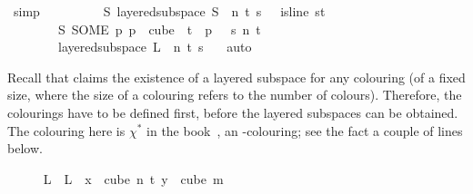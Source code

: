 \begin{isabellebody}
\ simp\isanewline
\ \ \ \ \ \ \isamarkupfalse%
\ \isamarkupfalse%
\ {\isachardoublequoteopen}{\isasymexists}S{\isachardot}{\kern0pt}\ layered{\isacharunderscore}{\kern0pt}subspace\ S\ {}\ n\ t\ s\ {\isasymchi}\ {\isasymand}\ is{\isacharunderscore}{\kern0pt}line\ {\isacharparenleft}{\kern0pt}{\isasymlambda}s{\isasymin}{\isacharbraceleft}{\kern0pt}{\isachardot}{\kern0pt}{\isachardot}{\kern0pt}{\isacharless}{\kern0pt}t\isanewline
\ \ \ \ \ \ {\isacharplus}{\kern0pt}\ {}{\isacharbraceright}{\kern0pt}{\isachardot}{\kern0pt}\ S\ {\isacharparenleft}{\kern0pt}SOME\ p{\isachardot}{\kern0pt}\ p\ {\isasymin}\ cube\ {}\ {\isacharparenleft}{\kern0pt}t{\isacharplus}{\kern0pt}{}{\isacharparenright}{\kern0pt}\ {\isasymand}\ p\ {}\ {\isacharequal}{\kern0pt}\ s{\isacharparenright}{\kern0pt}{\isacharparenright}{\kern0pt}\ n\ {\isacharparenleft}{\kern0pt}t\ {\isacharplus}{\kern0pt}\ {}{\isacharparenright}{\kern0pt}{\isachardoublequoteclose}\ \isamarkupfalse%
\isanewline
\ \ \ \ \ \ \ \ {\isacartoucheopen}layered{\isacharunderscore}{\kern0pt}subspace\ L\ {}\ n\ t\ s\ {\isasymchi}{\isacartoucheclose}\ \isamarkupfalse%
\ auto\isanewline
\ \ \ \ \isamarkupfalse%
%
\endisatagproof
{\isafoldproof}%
%
\isadelimproof
%
\endisadelimproof
%
\isadelimdocument
%
\endisadelimdocument
%
\isatagdocument
%
\isamarkuptrue%
%
\begin{isamarkuptext}%
Recall that  claims the existence of a layered subspace for any colouring
    (of a fixed size, where the size of a colouring refers to the number of colours). Therefore, the
    colourings have to be defined first, before the layered subspaces can be obtained. The colouring
     here is $\chi^*$ in the book~\cite{thebook}, an
    -colouring; see the fact  a couple of lines
    below.%
\end{isamarkuptext}\isamarkuptrue%
%
\endisatagdocument
{\isafolddocument}%
%
\isadelimdocument
%
\endisadelimdocument
%
\isadelimproof
\ \ \ \ %
\endisadelimproof
%
\isatagproof
{}\isamarkupfalse%
\ {\isasymchi}L\ \ {\isachardoublequoteopen}{\isasymchi}L\ {\isasymequiv}\ {\isacharparenleft}{\kern0pt}{\isasymlambda}x\ {\isasymin}\ cube\ n\ {\isacharparenleft}{\kern0pt}t{\isacharplus}{\kern0pt}{}{\isacharparenright}{\kern0pt}{\isachardot}{\kern0pt}\ {\isacharparenleft}{\kern0pt}{\isasymlambda}y\ {\isasymin}\ cube\ m\isanewline

\end{isabellebody}
